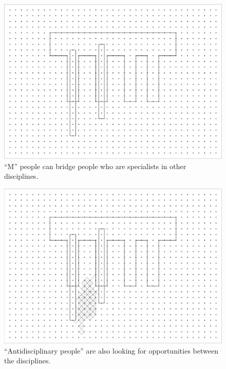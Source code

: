\begin{figure}[h]
 \centering
 \includegraphics[width=1\textwidth]{pictures/JoiIllustr_V3-03.jpg}
 \caption{``M'' people can bridge people who are specialists in other disciplines.}
 \label{fig:discipline003}
\end{figure}

\begin{figure}[h]
 \centering
 \includegraphics[width=1\textwidth]{pictures/JoiIllustr_V3-04.jpg}
 \caption{``Antidisciplinary people'' are also looking for opportunities between the disciplines.}
 \label{fig:discipline004}
\end{figure}

